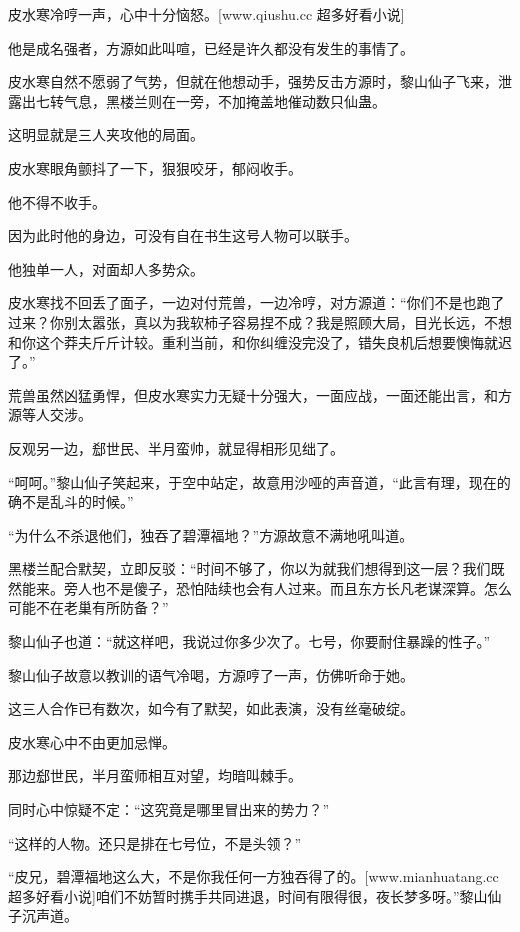 
\begin{this_body}

皮水寒冷哼一声，心中十分恼怒。[www.qiushu.cc 超多好看小说]

他是成名强者，方源如此叫喧，已经是许久都没有发生的事情了。

皮水寒自然不愿弱了气势，但就在他想动手，强势反击方源时，黎山仙子飞来，泄露出七转气息，黑楼兰则在一旁，不加掩盖地催动数只仙蛊。

这明显就是三人夹攻他的局面。

皮水寒眼角颤抖了一下，狠狠咬牙，郁闷收手。

他不得不收手。

因为此时他的身边，可没有自在书生这号人物可以联手。

他独单一人，对面却人多势众。

皮水寒找不回丢了面子，一边对付荒兽，一边冷哼，对方源道：“你们不是也跑了过来？你别太嚣张，真以为我软柿子容易捏不成？我是照顾大局，目光长远，不想和你这个莽夫斤斤计较。重利当前，和你纠缠没完没了，错失良机后想要懊悔就迟了。”

荒兽虽然凶猛勇悍，但皮水寒实力无疑十分强大，一面应战，一面还能出言，和方源等人交涉。

反观另一边，郄世民、半月蛮帅，就显得相形见绌了。

“呵呵。”黎山仙子笑起来，于空中站定，故意用沙哑的声音道，“此言有理，现在的确不是乱斗的时候。”

“为什么不杀退他们，独吞了碧潭福地？”方源故意不满地吼叫道。

黑楼兰配合默契，立即反驳：“时间不够了，你以为就我们想得到这一层？我们既然能来。旁人也不是傻子，恐怕陆续也会有人过来。而且东方长凡老谋深算。怎么可能不在老巢有所防备？”

黎山仙子也道：“就这样吧，我说过你多少次了。七号，你要耐住暴躁的性子。”

黎山仙子故意以教训的语气冷喝，方源哼了一声，仿佛听命于她。

这三人合作已有数次，如今有了默契，如此表演，没有丝毫破绽。

皮水寒心中不由更加忌惮。

那边郄世民，半月蛮师相互对望，均暗叫棘手。

同时心中惊疑不定：“这究竟是哪里冒出来的势力？”

“这样的人物。还只是排在七号位，不是头领？”

“皮兄，碧潭福地这么大，不是你我任何一方独吞得了的。[www.mianhuatang.cc 超多好看小说]咱们不妨暂时携手共同进退，时间有限得很，夜长梦多呀。”黎山仙子沉声道。


\end{this_body}

